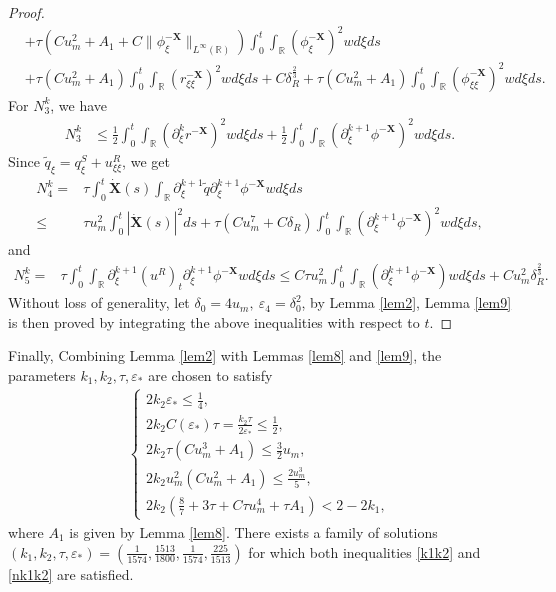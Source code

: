 \documentclass[10pt,reqno]{amsart}
\numberwithin{equation}{section}
\begin{document}
\begin{proof}
\begin{align*}
			&+\tau\left(Cu_m^2+A_1+C\|\phi_{\xi}^{-\mathbf{X}}\|_{L^{\infty}(\mathbb{R})}\right)\int_0^t\int_{\mathbb{R}}(\phi_{\xi}^{-\mathbf{X}})^2wd\xi ds\\
			&+\tau(Cu_m^2+A_1)\int_0^t\int_{\mathbb{R}}(r_{\xi\xi}^{-\mathbf{X}})^2wd\xi ds+C\delta_R^{\frac{2}{3}}+\tau(Cu_m^2+A_1)\int_0^t\int_{\mathbb{R}}(\phi_{\xi\xi}^{-\mathbf{X}})^2wd\xi ds.
		\end{align*}
		For $N_3^k$, we have
		\begin{align*}
			N_3^k&\leq\frac{1}{2}\int_{0}^t\int_{\mathbb{R}}(\partial_{\xi}^kr^{-\mathbf{X}})^2wd\xi ds+\frac{1}{2}\int_{0}^t\int_{\mathbb{R}}(\partial_{\xi}^{k+1}\phi^{-\mathbf{X}})^2wd\xi ds.
		\end{align*}
		Since $\tilde{q}_{\xi}=q^S_{\xi}+u^R_{\xi\xi}$, we get
		\begin{align*}
			N_4^k=&\tau\int_{0}^t\dot{\mathbf{X}}(s)\int_{\mathbb{R}}\partial_{\xi}^{k+1}\tilde{q}\partial_{\xi}^{k+1}\phi^{-\mathbf{X}}wd\xi ds\\
			\leq&\tau u_m^2\int_{0}^t\left|\dot{\mathbf{X}}(s)\right|^2ds+\tau\left(Cu_m^7+C\delta_R\right)\int_{0}^t\int_{\mathbb{R}}(\partial_{\xi}^{k+1}\phi^{-\mathbf{X}})^2wd\xi ds,
		\end{align*}
		and
		\begin{align*}
			N_5^k=&\tau\int_{0}^t\int_{\mathbb{R}}\partial_{\xi}^{k+1}(u^R)_t\partial_{\xi}^{k+1}\phi^{-\mathbf{X}}wd\xi ds
			\leq C\tau u_m^2\int_{0}^t\int_{\mathbb{R}}(\partial_{\xi}^{k+1}\phi^{-\mathbf{X}})wd\xi ds+Cu_m^2\delta_R^{\frac{2}{3}}.
		\end{align*}
		Without loss of generality, let $\delta_{0}=4u_m,\ \varepsilon_{4}=\delta_{0}^2$, by Lemma \ref{lem2}, Lemma \ref{lem9} is then proved by integrating the above inequalities with respect to $t$.
	\end{proof}
	Finally, Combining Lemma \ref{lem2} with Lemmas \ref{lem8} and \ref{lem9}, the parameters $k_1,k_2,\tau,\varepsilon_*$ are chosen to satisfy
	\begin{align}\label{nk1k2}
		\begin{cases}
			2k_2\varepsilon_*\leq\frac{1}{4},\\
			2k_2C(\varepsilon_*)\tau=\frac{k_2\tau}{2\varepsilon_*}\leq \frac{1}{2},\\
			2k_2\tau(Cu_m^3+A_1)\leq \frac{3}{2}u_m,\\
			2k_2u_m^2(Cu_m^2+A_1)\leq \frac{2u_m^3}{5},\\
			2k_2(\frac{8}{7}+3\tau+C\tau u_m^4+\tau A_1)<2-2k_1, 
		\end{cases}
	\end{align}
	where $A_1$ is given by Lemma \ref{lem8}. There exists a family of solutions $(k_1,k_2,\tau,\varepsilon_*)=(\frac{1}{1574},\frac{1513}{1800},\frac{1}{1574},\frac{225}{1513})$ for which both inequalities \eqref{k1k2} and \eqref{nk1k2} are satisfied.
	
\end{document}

